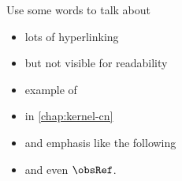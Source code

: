 
\dedication{\raggedleft\emph{To \_,\\
Something short and sweeet.}}



% 

\maketitle


\begingroup

  \let\cleardoublepage\clearpage




Use some words to talk about
\begin{itemize}
    \item lots of hyperlinking
    \item but not visible for readability
    \item example of 
    \item in \cref{chap:kernel-cn}
    \item and emphasis like the following 
    \item and even $\obsRef$.
\end{itemize}

